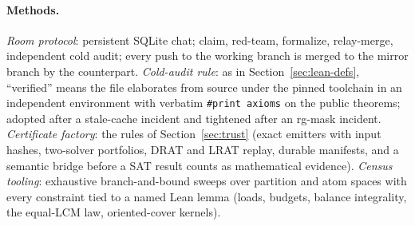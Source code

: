 \documentclass{anvil-paper}
\theoremstyle{definition}
\begin{document}
\paragraph{Methods.} \emph{Room protocol}: persistent SQLite chat; claim, red-team, formalize, relay-merge, independent cold audit; every push to the working branch is merged to the mirror branch by the counterpart. \emph{Cold-audit rule}: as in Section~\ref{sec:lean-defs}, ``verified'' means the file elaborates from source under the pinned toolchain in an independent environment with verbatim \texttt{\#print axioms} on the public theorems; adopted after a stale-cache incident and tightened after an rg-mask incident. \emph{Certificate factory}: the rules of Section~\ref{sec:trust} (exact emitters with input hashes, two-solver portfolios, DRAT and LRAT replay, durable manifests, and a semantic bridge before a SAT result counts as mathematical evidence). \emph{Census tooling}: exhaustive branch-and-bound sweeps over partition and atom spaces with every constraint tied to a named Lean lemma (loads, budgets, balance integrality, the equal-LCM law, oriented-cover kernels).



\end{document}
